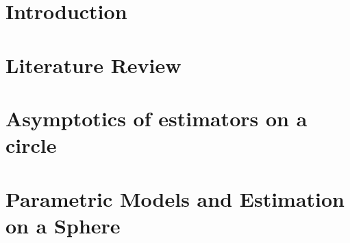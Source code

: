 \documentclass[phd]{uncgdissertation}
\begin{document}
\tableofcontents %


\listoftables   


\listoffigures   


\mainmatter %


\chapter{Introduction}


\chapter{Literature Review}



\chapter{Asymptotics of estimators on a circle}


\chapter{Parametric Models and Estimation on a Sphere}


\end{document}
